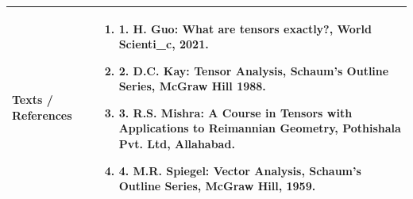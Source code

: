 \documentclass[11pt,a4paper]{article}
\begin{document}
\renewcommand{\arraystretch}{1.3}
\begin{tabularx}{\textwidth}{|p{3.2cm}|X|}
\hline
\textbf{Texts / References} & \begin{enumerate}[leftmargin=*,noitemsep,topsep=2pt]  \item 1. H. Guo: What are tensors exactly?, World Scienti\_c, 2021.  \item 2. D.C. Kay: Tensor Analysis, Schaum's Outline Series, McGraw Hill 1988.  \item 3. R.S. Mishra: A Course in Tensors with Applications to Reimannian Geometry, Pothishala Pvt.  Ltd, Allahabad.  \item 4. M.R. Spiegel: Vector Analysis, Schaum's Outline Series, McGraw Hill, 1959.\end{enumerate} \\
\hline
\end{tabularx}
\clearpage
\end{document}
